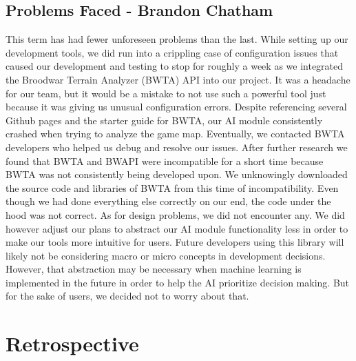 \documentclass[10pt,letterpaper,onecolumn,draftclsnofoot]{IEEEtran}
\begin{document}
	\subsection{Problems Faced - Brandon Chatham}
	This term has had fewer unforeseen problems than the last. While setting up our development tools, we did run into a crippling case of configuration issues that caused our development and testing to stop for roughly a week as we integrated the Broodwar Terrain Analyzer (BWTA) API into our project. It was a headache for our team, but it would be a mistake to not use such a powerful tool just because it was giving us unusual configuration errors. Despite referencing several Github pages and the starter guide for BWTA, our AI module consistently crashed when trying to analyze the game map. Eventually, we contacted BWTA developers who helped us debug and resolve our issues. After further research we found that BWTA and BWAPI were incompatible for a short time because BWTA was not consistently being developed upon. We unknowingly downloaded the source code and libraries of BWTA from this time of incompatibility. Even though we had done everything else correctly on our end, the code under the hood was not correct.
	As for design problems, we did not encounter any. We did however adjust our plans to abstract our AI module functionality less in order to make our tools more intuitive for users. Future developers using this library will likely not be considering macro or micro concepts in development decisions. However, that abstraction may be necessary when machine learning is implemented in the future in order to help the AI prioritize decision making. But for the sake of users, we decided not to worry about that. 
	
	\section{Retrospective}

	
\end{document}
